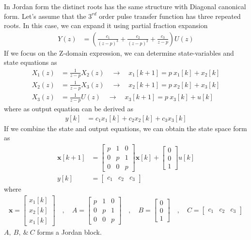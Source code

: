 \documentclass[twoside]{article}
\begin{document}
In Jordan form the distinct roots has the 
same structure with Diagonal canonical
form. Let's assume that the $3^{rd}$
order pulse transfer function has
three repeated roots. In this case,
we can expand it using partial fraction 
expansion 
%
\begin{align*}
Y(z) &= \left( \frac{c_1}{(z - p)^3} + \frac{c_2}{(z - p)^2}
+ \frac{c_3}{z - p} \right) U(z)
\end{align*}
%
If we focus on the Z-domain expression, we can determine
state-variables and state equations as
%
\begin{align*}
X_1(z) &= \frac{1}{z - p} X_2(z) \quad \rightarrow \quad x_1[k+1] = p \
  x_1[k] + x_2[k]
\\
X_2(z) &= \frac{1}{z - p} X_3(z) \quad \rightarrow \quad x_2[k+1] = p
         \ x_2[k] +
  x_3[k]
\\
X_3(z) &= \frac{1}{z - p} U(z) \quad \rightarrow \quad x_3[k+1] = p \
  x_3[k] + u[k]
\end{align*}
%
where as output equation can be derived as
%
\begin{align*}
y[k] &= c_1 x_1[k] + c_2 x_2[k] + c_3 x_3[k]
\end{align*}
%
If we combine the state and output equations, we
can obtain the state space form as
%
\begin{align*}
  \mathbf{x}[k+1] &= \left[ \begin{array}{ccc} p & 1 & 0\\ 0 & p & 1
    \\ 0 & 0 & p \end{array} \right] \mathbf{x}[k]
   + 
  \left[ \begin{array}{c} 0 \\ 0
    \\ 1 \end{array} \right] u[k]
\\
y[k] &= \left[ \begin{array}{ccc} c_1 & c_2 & c_3 \end{array} \right]
\end{align*}
%
where 
%
\begin{align*}
\mathbf{x} = \left[ \begin{array}{c} x_1[k] \\ x_2[k] \\
x_1[k] \end{array} \right] \quad , \quad
A = \left[ \begin{array}{ccc} p & 1 & 0 \\ 0 & p & 1
    \\ 0 & 0 & p \end{array} \right]
\quad , \quad 
B = \left[ \begin{array}{c} 0 \\ 0
    \\ 1 \end{array} \right]
\quad , \quad
C = \left[ \begin{array}{ccc} c_1 & c_2 & c_3 \end{array} \right]
\end{align*}
%
$A, \ B, \ \& \ C$ forms a Jordan block. 
\end{document}
